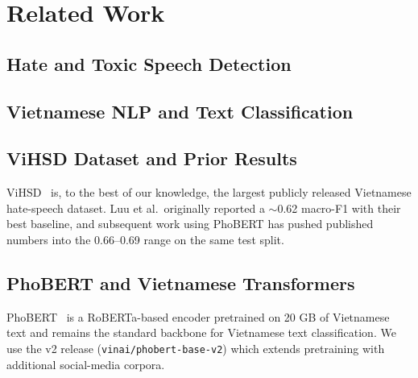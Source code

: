 \documentclass[a4paper,12pt,oneside]{report}
\begin{document}
\chapter{Related Work}
\label{ch:related}

\section{Hate and Toxic Speech Detection}

\section{Vietnamese NLP and Text Classification}

\section{ViHSD Dataset and Prior Results}
ViHSD~\cite{luu2021vihsd} is, to the best of our knowledge, the largest
publicly released Vietnamese hate-speech dataset. Luu et al.\ originally
reported a $\sim$0.62 macro-F1 with their best baseline, and subsequent
work using PhoBERT has pushed published numbers into the
0.66--0.69 range on the same test split.

\section{PhoBERT and Vietnamese Transformers}
PhoBERT~\cite{nguyen2020phobert} is a RoBERTa-based encoder pretrained on
20 GB of Vietnamese text and remains the standard backbone for
Vietnamese text classification. We use the v2 release
(\texttt{vinai/phobert-base-v2}) which extends pretraining with
additional social-media corpora.
\end{document}
